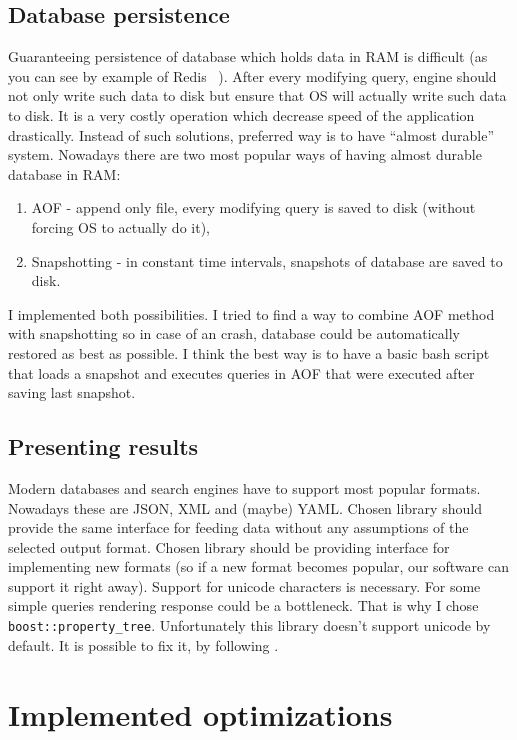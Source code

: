 \documentclass[10pt,a4paper]{article}
\begin{document}
\subsection{Database persistence}
Guaranteeing persistence of database which holds data in RAM is difficult (as you can see by example of Redis ~\cite{REDPE}). After every modifying query, engine should not only write such data to disk but ensure that OS will actually write such data to disk. It is a very costly operation which decrease speed of the application drastically. Instead of such solutions, preferred way is to have “almost durable” system.
Nowadays there are two most popular ways of having almost durable database in RAM:

\begin{enumerate}
\item AOF - append only file, every modifying query is saved to disk (without forcing OS to actually do it),
\item Snapshotting - in constant time intervals, snapshots of database are saved to disk.
\end{enumerate}
I implemented both possibilities. I tried to find a way to combine AOF method with snapshotting so in case of an crash, database could be automatically restored as best as possible. I think the best way is to have a basic bash script that loads a snapshot and executes queries in AOF that were executed after saving last snapshot.

\subsection{Presenting results}
Modern databases and search engines have to support most popular formats. Nowadays these are
JSON, XML and (maybe) YAML. Chosen library should provide the same interface for feeding data without any assumptions of the selected output format. Chosen library should be providing interface for implementing new formats (so if a new format becomes popular, our software can support it right away). Support for unicode characters is necessary. For some simple queries rendering response could be a bottleneck. That is why I chose \verb|boost::property_tree|. 
Unfortunately this library doesn't support unicode by default. It is possible to fix it, by following \cite{SOANS} .

\section{Implemented optimizations}
\end{document}
